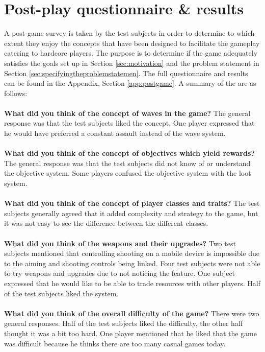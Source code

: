 \section{Post-play questionnaire \& results}
A post-game survey is taken by the test subjects in order to determine to which extent they enjoy the concepts that have been designed to facilitate the gameplay catering to hardcore players.
The purpose is to determine if the game adequately satisfies the goals set up in Section \ref{sec:motivation} and the problem statement in Section \ref{sec:specifyingtheproblemstatemen}.
The full questionnaire and results can be found in the Appendix, Section \ref{app:postgame}.
A summary of the are as follows:\\\\
\textbf{What did you think of the concept of waves in the game?}
The general response was that the test subjects liked the concept.
One player expressed that he would have preferred a constant assault instead of the wave system.\\\\
\textbf{What did you think of the concept of objectives which yield rewards?}
The general response was that the test subjects did not know of or understand the objective system.
Some players confused the objective system with the loot system.\\\\
\textbf{What did you think of the concept of player classes and traits?}
The test subjects generally agreed that it added complexity and strategy to the game, but it was not easy to see the difference between the different classes.\\\\
\textbf{What did you think of the weapons and their upgrades?}
Two test subjects mentioned that controlling shooting on a mobile device is impossible due to the aiming and shooting controls being linked.
Four test subjects were not able to try weapons and upgrades due to not noticing the feature.
One subject expressed that he would like to be able to trade resources with other players.
Half of the test subjects liked the system.\\\\
\textbf{What did you think of the overall difficulty of the game?}
There were two general responses.
Half of the test subjects liked the difficulty, the other half thought it was a bit too hard.
One player mentioned that he liked that the game was difficult because he thinks there are too many casual games today.\\\\
